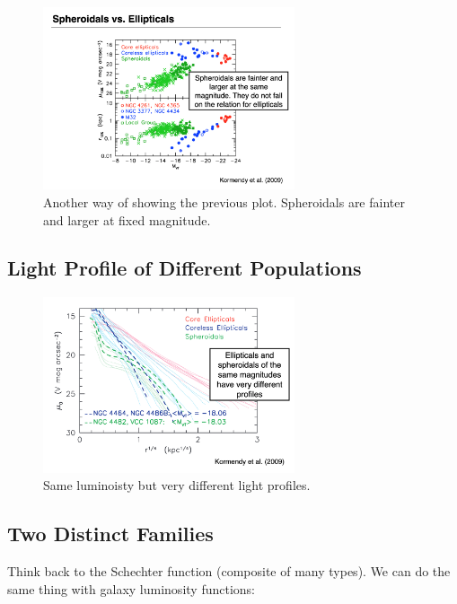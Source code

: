 \documentclass{article}
\begin{document}
\begin{figure}
    \centering
\includegraphics[width=0.66\textwidth]{figs/Screen Shot 2021-10-15 at 10.16.56 AM.png}
    \caption{Another way of showing the previous plot. Spheroidals are fainter and larger at fixed magnitude. }
    \label{fig:MoreMoreMore}
\end{figure}

\subsection{Light Profile of Different Populations}

\begin{figure}
    \centering
\includegraphics[width=0.66\textwidth]{figs/Screen Shot 2021-10-15 at 10.23.06 AM.png}
    \caption{Same luminoisty but very different light profiles. }
    \label{fig:light_profile_differences}
\end{figure}

\subsection{Two Distinct Families}

Think back to the Schechter function (composite of many types). We can do the same thing with galaxy luminosity functions:
\end{document}
